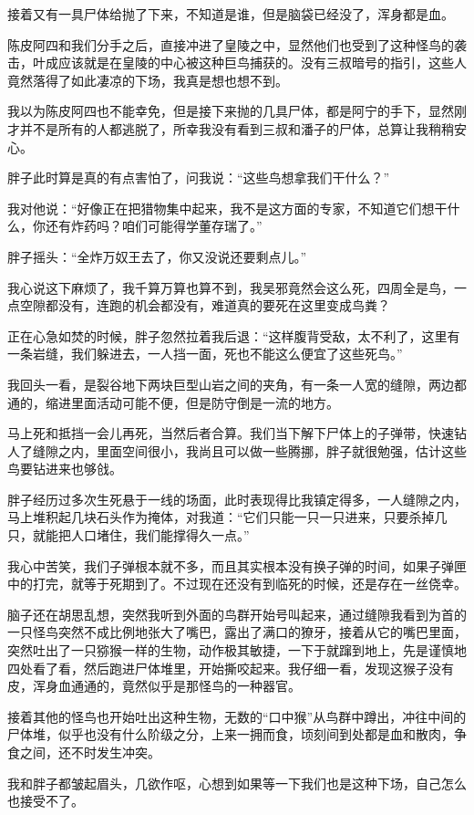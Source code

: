 接着又有一具尸体给抛了下来，不知道是谁，但是脑袋已经没了，浑身都是血。

陈皮阿四和我们分手之后，直接冲进了皇陵之中，显然他们也受到了这种怪鸟的袭击，叶成应该就是在皇陵的中心被这种巨鸟捕获的。没有三叔暗号的指引，这些人竟然落得了如此凄凉的下场，我真是想也想不到。

我以为陈皮阿四也不能幸免，但是接下来抛的几具尸体，都是阿宁的手下，显然刚才并不是所有的人都逃脱了，所幸我没有看到三叔和潘子的尸体，总算让我稍稍安心。

胖子此时算是真的有点害怕了，问我说：“这些鸟想拿我们干什么？”

我对他说：“好像正在把猎物集中起来，我不是这方面的专家，不知道它们想干什么，你还有炸药吗？咱们可能得学董存瑞了。”

胖子摇头：“全炸万奴王去了，你又没说还要剩点儿。”

我心说这下麻烦了，我千算万算也算不到，我吴邪竟然会这么死，四周全是鸟，一点空隙都没有，连跑的机会都没有，难道真的要死在这里变成鸟粪？

正在心急如焚的时候，胖子忽然拉着我后退：“这样腹背受敌，太不利了，这里有一条岩缝，我们躲进去，一人挡一面，死也不能这么便宜了这些死鸟。”

我回头一看，是裂谷地下两块巨型山岩之间的夹角，有一条一人宽的缝隙，两边都通的，缩进里面活动可能不便，但是防守倒是一流的地方。

马上死和抵挡一会儿再死，当然后者合算。我们当下解下尸体上的子弹带，快速钻人了缝隙之内，里面空间很小，我尚且可以做一些腾挪，胖子就很勉强，估计这些鸟要钻进来也够戗。

胖子经历过多次生死悬于一线的场面，此时表现得比我镇定得多，一人缝隙之内，马上堆积起几块石头作为掩体，对我道：“它们只能一只一只进来，只要杀掉几只，就能把人口堵住，我们能撑得久一点。”

我心中苦笑，我们子弹根本就不多，而且其实根本没有换子弹的时间，如果子弹匣中的打完，就等于死期到了。不过现在还没有到临死的时候，还是存在一丝侥幸。

脑子还在胡思乱想，突然我听到外面的鸟群开始号叫起来，通过缝隙我看到为首的一只怪鸟突然不成比例地张大了嘴巴，露出了满口的獠牙，接着从它的嘴巴里面，突然吐出了一只猕猴一样的生物，动作极其敏捷，一下于就蹿到地上，先是谨慎地四处看了看，然后跑进尸体堆里，开始撕咬起来。我仔细一看，发现这猴子没有皮，浑身血通通的，竟然似乎是那怪鸟的一种器官。

接着其他的怪鸟也开始吐出这种生物，无数的“口中猴”从鸟群中蹲出，冲往中间的尸体堆，似乎也没有什么阶级之分，上来一拥而食，顷刻间到处都是血和散肉，争食之间，还不时发生冲突。

我和胖子都皱起眉头，几欲作呕，心想到如果等一下我们也是这种下场，自己怎么也接受不了。

